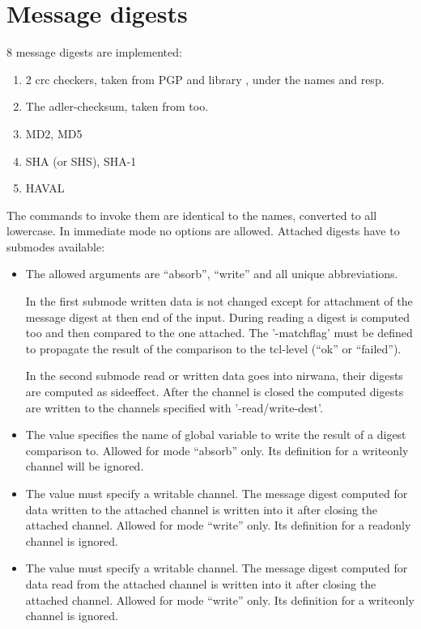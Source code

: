 \section {Message digests}

8 message digests are implemented:

\begin {enumerate}
\item	2 crc checkers, taken from PGP and library , under
	the names  and  resp.
\item	The adler-checksum, taken from  too.
\item	MD2, MD5
\item	SHA (or SHS), SHA-1
\item	HAVAL
\end   {enumerate}

The commands to invoke them are identical to the names, converted to
all lowercase. In immediate mode no options are allowed. Attached
digests have to submodes available:

\begin {itemize}
\item[-mode]	The allowed arguments are ``absorb'', ``write'' and
		all unique abbreviations.

		In the first submode written data is not changed
		except for attachment of the message digest at then
		end of the input. During reading a digest is computed
		too and then compared to the one attached. The
		'-matchflag' must be defined to propagate the result
		of the comparison to the tcl-level (``ok'' or ``failed'').

		In the second submode read or written data goes into
		nirwana, their digests are computed as
		sideeffect. After the channel is closed the computed
		digests are written to the channels specified with
		'-read/write-dest'.

\item[-matchflag]	The value specifies the name of global
			variable to write the result of a digest
			comparison to. Allowed for mode ``absorb''
			only. Its definition for a writeonly channel
			will be ignored.

\item[-write-dest]	The value must specify a writable channel. The
			message digest computed for data written to
			the attached channel is written into it after
			closing the attached channel. Allowed for mode
			``write'' only. Its definition for a readonly
			channel is ignored.

\item[-read-dest]	The value must specify a writable channel. The
			message digest computed for data read from
			the attached channel is written into it after
			closing the attached channel. Allowed for mode
			``write'' only. Its definition for a writeonly
			channel is ignored.
\end   {itemize}


